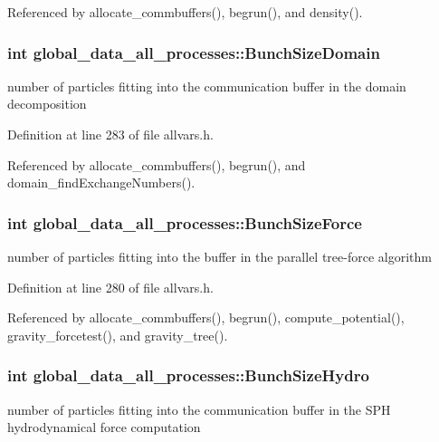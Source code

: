Referenced by allocate\_\-commbuffers(), begrun(), and density().

\hypertarget{structglobal__data__all__processes_abf3206e6032910640e91585c25bd85b2}{
\subsubsection[{BunchSizeDomain}]{\setlength{\rightskip}{0pt plus 5cm}int {\bf global\_\-data\_\-all\_\-processes::BunchSizeDomain}}}
\label{structglobal__data__all__processes_abf3206e6032910640e91585c25bd85b2}
number of particles fitting into the communication buffer in the domain decomposition 

Definition at line 283 of file allvars.h.



Referenced by allocate\_\-commbuffers(), begrun(), and domain\_\-findExchangeNumbers().

\hypertarget{structglobal__data__all__processes_a2f6d4697219a2ec2e3db7f09ab31bcea}{
\subsubsection[{BunchSizeForce}]{\setlength{\rightskip}{0pt plus 5cm}int {\bf global\_\-data\_\-all\_\-processes::BunchSizeForce}}}
\label{structglobal__data__all__processes_a2f6d4697219a2ec2e3db7f09ab31bcea}
number of particles fitting into the buffer in the parallel tree-\/force algorithm 

Definition at line 280 of file allvars.h.



Referenced by allocate\_\-commbuffers(), begrun(), compute\_\-potential(), gravity\_\-forcetest(), and gravity\_\-tree().

\hypertarget{structglobal__data__all__processes_afe2775a289a902710358d98ba607a0aa}{
\subsubsection[{BunchSizeHydro}]{\setlength{\rightskip}{0pt plus 5cm}int {\bf global\_\-data\_\-all\_\-processes::BunchSizeHydro}}}
\label{structglobal__data__all__processes_afe2775a289a902710358d98ba607a0aa}
number of particles fitting into the communication buffer in the SPH hydrodynamical force computation 


